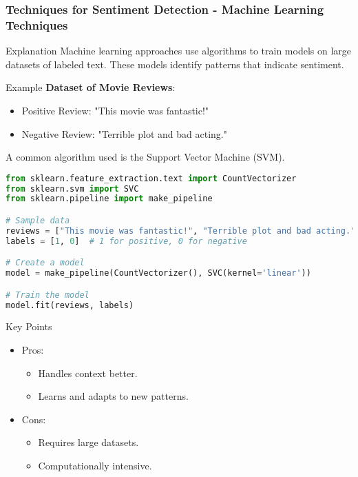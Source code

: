 \documentclass[aspectratio=169]{beamer}
\begin{document}
\begin{frame}
    \frametitle{Techniques for Sentiment Detection - Machine Learning Techniques}
    \begin{block}{Explanation}
        Machine learning approaches use algorithms to train models on large datasets of 
        labeled text. These models identify patterns that indicate sentiment.
    \end{block}
    
    \begin{block}{Example}
        \textbf{Dataset of Movie Reviews}: 
        \begin{itemize}
            \item Positive Review: "This movie was fantastic!"
            \item Negative Review: "Terrible plot and bad acting."
        \end{itemize}
        A common algorithm used is the Support Vector Machine (SVM).
    \end{block}
    
    \begin{lstlisting}[language=Python, caption=Training an SVM Classifier]
from sklearn.feature_extraction.text import CountVectorizer
from sklearn.svm import SVC
from sklearn.pipeline import make_pipeline

# Sample data
reviews = ["This movie was fantastic!", "Terrible plot and bad acting."]
labels = [1, 0]  # 1 for positive, 0 for negative

# Create a model
model = make_pipeline(CountVectorizer(), SVC(kernel='linear'))

# Train the model
model.fit(reviews, labels)
    \end{lstlisting}
    
    \begin{block}{Key Points}
        \begin{itemize}
            \item Pros:
            \begin{itemize}
                \item Handles context better.
                \item Learns and adapts to new patterns.
            \end{itemize}
            \item Cons:
            \begin{itemize}
                \item Requires large datasets.
                \item Computationally intensive.
            \end{itemize}
        \end{itemize}
    \end{block}
\end{frame}
\end{document}
